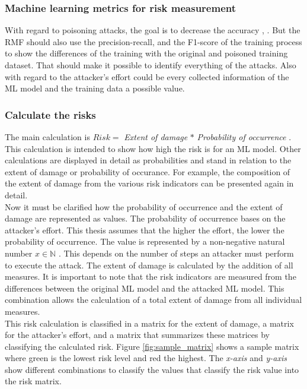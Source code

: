 \subsubsection*{Machine learning metrics for risk measurement}

With regard to poisoning attacks, the goal is to decrease the accuracy \cite{DBLP:conf/icml/BiggioNL12}, \cite{DBLP:journals/corr/abs-1708-06733}. But the RMF should also use the precision-recall, and the F1-score of the training process to show the differences of the training with the original and poisoned training dataset. That should make it possible to identify everything of the attacks. Also with regard to the attacker's effort could be every collected information of the ML model and the training data a possible value.

\subsubsection*{Calculate the risks}

The main calculation is $Risk = $ \textit{Extent of damage} $*$ \textit{Probability of occurrence} \cite{DBLP:journals/access/JianxingHSH21}. This calculation is intended to show how high the risk is for an ML model. Other calculations are displayed in detail as probabilities and stand in relation to the extent of damage or probability of occurance. For example, the composition of the extent of damage from the various risk indicators can be presented again in detail. \\
Now it must be clarified how the probability of occurrence and the extent of damage are represented as values. The probability of occurrence bases on the attacker's effort. This thesis assumes that the higher the effort, the lower the probability of occurrence. The value is represented by a non-negative natural number $x \in \mathbb{N}$ \cite{Morazan2022}. This depends on the number of steps an attacker must perform to execute the attack. The extent of damage is calculated by the addition of all measures. It is important to note that the risk indicators are measured from the differences between the original ML model and the attacked ML model. This combination allows the calculation of a total extent of damage from all individual measures. \\
This risk calculation is classified in a matrix for the extent of damage, a matrix for the attacker's effort, and a matrix that summarizes these matrices by classifying the calculated risk. Figure \ref{fig:sample_matrix} shows a sample matrix where green is the lowest risk level and red the highest. The \textit{x-axis} and \textit{y-axis} show different combinations to classify the values that classify the risk value into the risk matrix.

